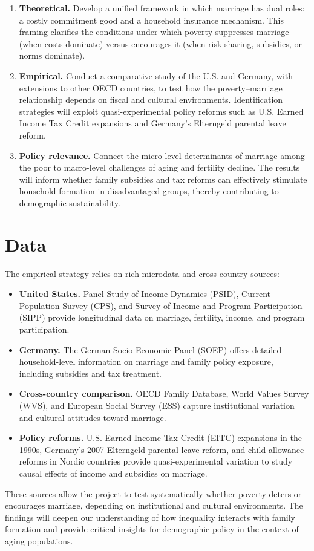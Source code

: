 \begin{enumerate}
\item \textbf{Theoretical.} Develop a unified framework in which marriage has dual roles: a costly commitment good and a household insurance mechanism. This framing clarifies the conditions under which poverty suppresses marriage (when costs dominate) versus encourages it (when risk-sharing, subsidies, or norms dominate).
\item \textbf{Empirical.} Conduct a comparative study of the U.S. and Germany, with extensions to other OECD countries, to test how the poverty–marriage relationship depends on fiscal and cultural environments. Identification strategies will exploit quasi-experimental policy reforms such as U.S. Earned Income Tax Credit expansions and Germany’s Elterngeld parental leave reform.
\item \textbf{Policy relevance.} Connect the micro-level determinants of marriage among the poor to macro-level challenges of aging and fertility decline. The results will inform whether family subsidies and tax reforms can effectively stimulate household formation in disadvantaged groups, thereby contributing to demographic sustainability.
\end{enumerate}

\section*{Data}

The empirical strategy relies on rich microdata and cross-country sources:

\begin{itemize}
\item \textbf{United States.} Panel Study of Income Dynamics (PSID), Current Population Survey (CPS), and Survey of Income and Program Participation (SIPP) provide longitudinal data on marriage, fertility, income, and program participation.
\item \textbf{Germany.} The German Socio-Economic Panel (SOEP) offers detailed household-level information on marriage and family policy exposure, including subsidies and tax treatment.
\item \textbf{Cross-country comparison.} OECD Family Database, World Values Survey (WVS), and European Social Survey (ESS) capture institutional variation and cultural attitudes toward marriage.
\item \textbf{Policy reforms.} U.S. Earned Income Tax Credit (EITC) expansions in the 1990s, Germany’s 2007 Elterngeld parental leave reform, and child allowance reforms in Nordic countries provide quasi-experimental variation to study causal effects of income and subsidies on marriage.
\end{itemize}

These sources allow the project to test systematically whether poverty deters or encourages marriage, depending on institutional and cultural environments. The findings will deepen our understanding of how inequality interacts with family formation and provide critical insights for demographic policy in the context of aging populations.
\newpage






